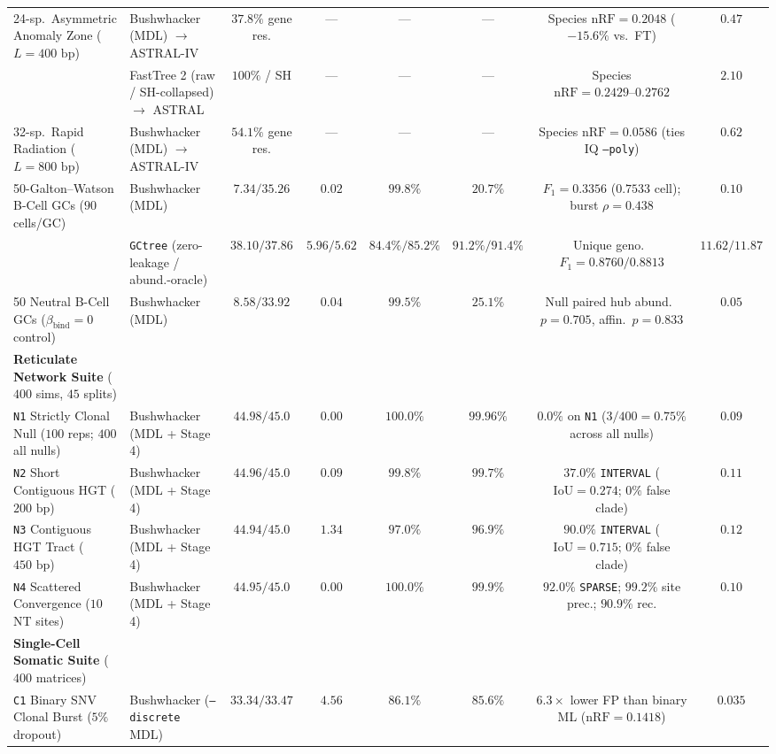 \documentclass[12pt]{article}
\begin{document}
\begin{table}[H]
{\begin{tabular}{@{}llcccccc@{}}
24-sp.\ Asymmetric Anomaly Zone ($L=400\text{ bp}$) & Bushwhacker (MDL) $\to$ ASTRAL-IV & $37.8\%$ gene res. & --- & --- & --- & Species $\text{nRF} = 0.2048$ ($-15.6\%$ vs.\ FT) & $0.47$ \\
& FastTree 2 (raw / SH-collapsed) $\to$ ASTRAL & $100\%$ / SH & --- & --- & --- & Species $\text{nRF} = 0.2429\text{--}0.2762$ & $2.10$ \\
32-sp.\ Rapid Radiation ($L=800\text{ bp}$) & Bushwhacker (MDL) $\to$ ASTRAL-IV & $54.1\%$ gene res. & --- & --- & --- & Species $\text{nRF} = 0.0586$ (ties IQ \texttt{--poly}) & $0.62$ \\
50-Galton--Watson B-Cell GCs ($90$ cells/GC) & Bushwhacker (MDL) & $7.34 / 35.26$ & $0.02$ & $99.8\%$ & $20.7\%$ & $F_1 = 0.3356$ ($0.7533$ cell); burst $\rho = 0.438$ & $0.10$ \\
& \texttt{GCtree} (zero-leakage / abund.-oracle) & $38.10 / 37.86$ & $5.96 / 5.62$ & $84.4\% / 85.2\%$ & $91.2\% / 91.4\%$ & Unique geno.\ $F_1 = 0.8760 / 0.8813$ & $11.62 / 11.87$ \\
50 Neutral B-Cell GCs ($\beta_{\text{bind}} = 0$ control) & Bushwhacker (MDL) & $8.58 / 33.92$ & $0.04$ & $99.5\%$ & $25.1\%$ & Null paired hub abund.\ $p=0.705$, affin.\ $p=0.833$ & $0.05$ \\
\midrule
\textbf{Reticulate Network Suite} ($400$ sims, $45$ splits) & & & & & & & \\
\texttt{N1} Strictly Clonal Null ($100$ reps; $400$ all nulls) & Bushwhacker (MDL + Stage 4) & $44.98 / 45.0$ & $0.00$ & $100.0\%$ & $99.96\%$ & $0.0\%$ on \texttt{N1} ($3/400 = 0.75\%$ across all nulls) & $0.09$ \\
\texttt{N2} Short Contiguous HGT ($200\text{ bp}$) & Bushwhacker (MDL + Stage 4) & $44.96 / 45.0$ & $0.09$ & $99.8\%$ & $99.7\%$ & $37.0\%$ \texttt{INTERVAL} ($\text{IoU} = 0.274$; $0\%$ false clade) & $0.11$ \\
\texttt{N3} Contiguous HGT Tract ($450\text{ bp}$) & Bushwhacker (MDL + Stage 4) & $44.94 / 45.0$ & $1.34$ & $97.0\%$ & $96.9\%$ & $90.0\%$ \texttt{INTERVAL} ($\text{IoU} = 0.715$; $0\%$ false clade) & $0.12$ \\
\texttt{N4} Scattered Convergence ($10$ NT sites) & Bushwhacker (MDL + Stage 4) & $44.95 / 45.0$ & $0.00$ & $100.0\%$ & $99.9\%$ & $92.0\%$ \texttt{SPARSE}; $99.2\%$ site prec.; $90.9\%$ rec. & $0.10$ \\
\midrule
\textbf{Single-Cell Somatic Suite} ($400$ matrices) & & & & & & & \\
\texttt{C1} Binary SNV Clonal Burst ($5\%$ dropout) & Bushwhacker (\texttt{--discrete} MDL) & $33.34 / 33.47$ & $4.56$ & $86.1\%$ & $85.6\%$ & $6.3\times$ lower FP than binary ML ($\text{nRF}=0.1418$) & $0.035$ \\

\end{tabular}}
\end{table}
\end{document}
